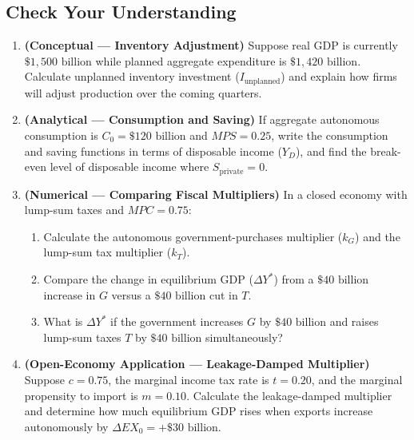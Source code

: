 \documentclass[11pt,letterpaper]{article}
\begin{document}
\subsection*{Check Your Understanding}
\begin{enumerate}
    \item \textbf{(Conceptual — Inventory Adjustment)} Suppose real GDP is currently $\$1{,}500\text{ billion}$ while planned aggregate expenditure is $\$1{,}420\text{ billion}$. Calculate unplanned inventory investment ($I_{\text{unplanned}}$) and explain how firms will adjust production over the coming quarters.
    \item \textbf{(Analytical — Consumption and Saving)} If aggregate autonomous consumption is $C_0 = \$120\text{ billion}$ and $MPS = 0.25$, write the consumption and saving functions in terms of disposable income ($Y_D$), and find the break-even level of disposable income where $S_{\text{private}} = 0$.
    \item \textbf{(Numerical — Comparing Fiscal Multipliers)} In a closed economy with lump-sum taxes and $MPC = 0.75$:
    \begin{enumerate}
        \item Calculate the autonomous government-purchases multiplier ($k_G$) and the lump-sum tax multiplier ($k_T$).
        \item Compare the change in equilibrium GDP ($\Delta Y^*$) from a $\$40\text{ billion}$ increase in $G$ versus a $\$40\text{ billion}$ cut in $T$.
        \item What is $\Delta Y^*$ if the government increases $G$ by $\$40\text{ billion}$ and raises lump-sum taxes $T$ by $\$40\text{ billion}$ simultaneously?
    \end{enumerate}
    \item \textbf{(Open-Economy Application — Leakage-Damped Multiplier)} Suppose $c = 0.75$, the marginal income tax rate is $t = 0.20$, and the marginal propensity to import is $m = 0.10$. Calculate the leakage-damped multiplier and determine how much equilibrium GDP rises when exports increase autonomously by $\Delta EX_0 = +\$30\text{ billion}$.
\end{enumerate}
\end{document}
